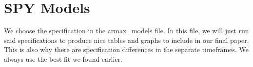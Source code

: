 \documentclass[
]{book}
\newenvironment{Shaded}{\begin{snugshade}}{\end{snugshade}}
\newcommand{\CommentTok}[1]{\textcolor[rgb]{0.56,0.35,0.01}{\textit{#1}}}
\newcommand{\FunctionTok}[1]{\textcolor[rgb]{0.13,0.29,0.53}{\textbf{#1}}}
\newcommand{\NormalTok}[1]{#1}
\newcommand{\OtherTok}[1]{\textcolor[rgb]{0.56,0.35,0.01}{#1}}
\newcommand{\SpecialCharTok}[1]{\textcolor[rgb]{0.81,0.36,0.00}{\textbf{#1}}}
\newcommand{\StringTok}[1]{\textcolor[rgb]{0.31,0.60,0.02}{#1}}
\begin{document}
\begin{Shaded}
\end{Shaded}

\section{SPY Models}\label{spy-models}

We choose the specification in the armax\_models file. In this file, we will
just run said specifications to produce nice tables and graphs to include in
our final paper. This is also why there are specification differences in the
separate timeframes. We always use the best fit we found earlier.
\end{document}
